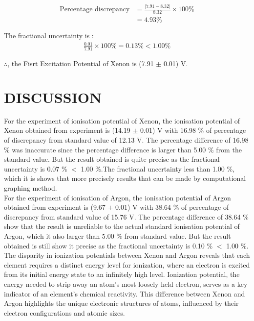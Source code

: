 \documentclass[a4paper,11pt]{article}
\begin{document}
\begin{align*}
\text{Percentage discrepancy}&= \frac{|7.91 - 8.32 |}{8.32} \times 100\% \\
&= 4.93 \%
\end{align*}

The fractional uncertainty is :
\begin{align*}
\frac{0.01}{7.91} \times 100 \% = 0.13 \%<1.00 \%
\end{align*}

$\therefore$, the Fisrt Excitation Potential of Xenon is (7.91 $\pm$ 0.01) V.


\newpage
{}
\section*{\center DISCUSSION}
\label{sec:DISCUSSION}
\quad For the experiment of ionisation potential of Xenon, the ionisation potential of Xenon obtained  from experiment is (14.19 $\pm$ 0.01) V with 16.98 \% of percentage of discrepancy from standard value of 12.13 V. The percentage difference of 16.98 \% was inaccurate since the percentage difference is larger than 5.00 \% from the standard value. But the result obtained is quite precise as the fractional uncertainty is  0.07 \% $<$ 1.00 \%.The fractional uncertainty less than 1.00 \%, which it is shows that more precisely results that can be made by computational graphing method.\\

For the experiment of ionisation of Argon, the ionisation potential of Argon obtained from experiment is (9.67 $\pm$ 0.01) V with 38.64 \% of percentage of discrepancy from standard value of 15.76 V. The percentage difference of 38.64 \% show that the result is unreliable to the 
actual standard ionisation potential of Argon, which it also larger than 5.00 \% from standard value. But the result obtained is still show it precise as the fractional uncertainty is  0.10 \% $<$  1.00 \%.\\

The disparity in ionization potentials between Xenon and Argon reveals that each element requires a distinct energy level for ionization, where an electron is excited from its initial energy state to an infinitely high level. Ionization potential, the energy needed to strip away an atom's most loosely held electron, serves as a key indicator of an element's chemical reactivity. This difference between Xenon and Argon highlights the unique electronic structures of atoms, influenced by their electron configurations and atomic sizes.\\
\end{document}
